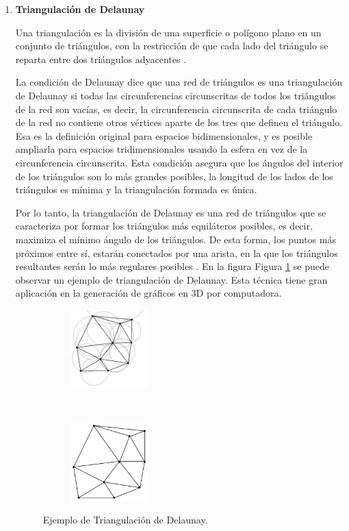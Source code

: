 \documentclass[11pt,twoside,A5]{article}
\newcommand{\reffigure}[1]{Figura \ref{#1}}
\begin{document}
\begin{enumerate}
\item \textbf{Triangulación de Delaunay}

Una triangulación es la división de una superficie o polígono plano en un conjunto de triángulos, con la restricción de que cada lado del triángulo se reparta entre dos triángulos adyacentes \cite{dma2015}.

La condición de Delaunay dice que una red de triángulos es una triangulación de Delaunay si todas las circunferencias circunscritas de todos los triángulos de la red son vacías, es decir, la 
circunferencia circunscrita de cada triángulo de la red no contiene otros vértices aparte de los tres que definen el triángulo. Esa es la definición original para espacios bidimensionales, y es posible ampliarla para espacios tridimensionales usando la esfera en vez de la circunferencia circunscrita. Esta condición asegura que los ángulos del interior de los triángulos son lo más grandes posibles, la longitud de los lados de los triángulos es mínima y la triangulación formada es única.

Por lo tanto, la triangulación de Delaunay es una red de triángulos que se caracteriza por formar los triángulos más equiláteros posibles, es decir, maximiza el mínimo ángulo de los triángulos. De esta forma, los puntos más próximos entre sí, estarán conectados por una arista, en la que los triángulos resultantes serán lo más regulares posibles \cite{dma2015,delaunay2015,berg2000,okabe2009}. En la figura \reffigure{fig:delaunay} 
se puede observar un ejemplo de triangulación de Delaunay. Esta técnica tiene gran aplicación en la generación de gráficos en 3D por computadora.

\begin{figure}[H]
\begin{center}
	\begin{subfigure}[b]{0.2\linewidth}
		\includegraphics[width=3cm]{delaunay_circumcircles.png}
	\end{subfigure}
	~~~~
    \begin{subfigure}[b]{0.2\linewidth}
		\includegraphics[width=3cm]{delaunay.png} 
	\end{subfigure}
\caption{Ejemplo de Triangulación de Delaunay.}
\label{fig:delaunay}
\end{center}
\end{figure}


\end{enumerate}
\end{document}
